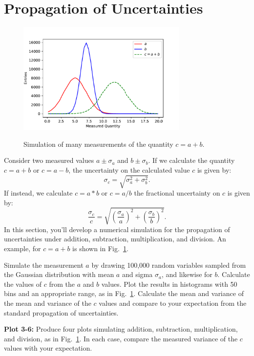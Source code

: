 \section{Propagation of Uncertainties}

\begin{figure}[htbp]
\begin{center}
\includegraphics[width=0.75\textwidth]{figs/uncertainties/addunc.pdf}\\
\end{center}
\caption{\label{fig:addunc} Simulation of many measurements of the quantity $c = a + b$. }
\end{figure}

Consider two measured values $a \pm \sigma_a$ and $b \pm \sigma_b$.  If we calculate the quantity $c = a + b$ or $c = a - b$, the uncertainty on the calculated value $c$ is given by:
\begin{displaymath}
\sigma_c = \sqrt{\sigma_a^2 + \sigma_b^2}.
\end{displaymath}
If instead, we calculate $c = a * b$ or $c = a/b$ the fractional uncertainty on $c$ is given by:
\begin{displaymath}
\frac{\sigma_c}{c} = \sqrt{\left(\frac{\sigma_a}{a}\right)^2 + \left(\frac{\sigma_b}{b}\right)^2}.
\end{displaymath}
In this section, you'll develop a numerical simulation for the
propagation of uncertainties under addition, subtraction,
multiplication, and division.  An example, for $c = a + b$ is shown in Fig.~\ref{fig:addunc}.

Simulate the measurement $a$ by drawing 100,000 random variables
sampled from the Gaussian distribution with mean $a$ and sigma
$\sigma_a$, and likewise for $b$.  Calculate the values of $c$ from
the $a$ and $b$ values.  Plot the results in histograms with 50 bins and an appropriate range, as in Fig.~\ref{fig:addunc}.  Calculate the mean and variance of the mean and variance of the $c$ values and compare to your expectation from the standard propagation of uncertainties.

{\bf Plot 3-6:}  Produce four plots simulating addition, subtraction, multiplication, and division, as in Fig.~\ref{fig:addunc}.  In each case, compare the measured variance of the $c$ values with your expectation.






























